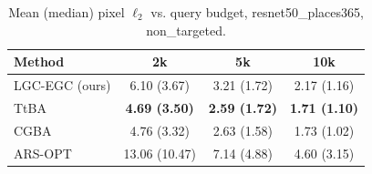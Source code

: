 \begin{table}[t]
\centering\footnotesize
\caption{Mean (median) pixel $\ell_2$ vs. query budget, resnet50\_places365, non\_targeted.}
\begin{tabular}{lccc}
\toprule
Method & 2k & 5k & 10k \\
\midrule
LGC-EGC (ours) & 6.10 (3.67) & 3.21 (1.72) & 2.17 (1.16) \\
TtBA & \textbf{4.69 (3.50)} & \textbf{2.59 (1.72)} & \textbf{1.71 (1.10)} \\
CGBA & 4.76 (3.32) & 2.63 (1.58) & 1.73 (1.02) \\
ARS-OPT & 13.06 (10.47) & 7.14 (4.88) & 4.60 (3.15) \\
\bottomrule
\end{tabular}
\end{table}
